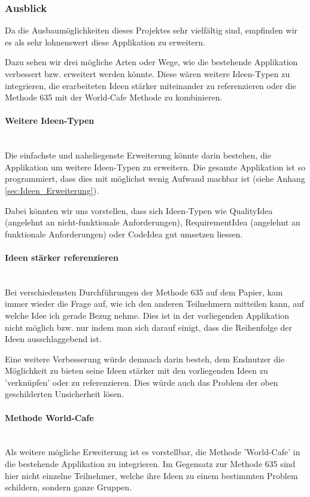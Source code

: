 \subsubsection{Ausblick}
\label{subsub:Ausblick}
Da die Ausbaumöglichkeiten dieses Projektes sehr vielfältig sind, empfinden wir es als sehr lohnenswert diese Applikation zu erweitern.

Dazu sehen wir drei mögliche Arten oder Wege, wie die bestehende Applikation verbessert bzw. erweitert werden könnte. Diese wären weitere Ideen-Typen zu integrieren, die erarbeiteten Ideen stärker miteinander zu referenzieren oder die Methode 635 mit der World-Cafe Methode zu kombinieren.

\paragraph*{Weitere Ideen-Typen}~\\
Die einfachste und naheliegenste Erweiterung könnte darin bestehen, die Applikation um weitere Ideen-Typen zu erweitern. Die gesamte Applikation ist so programmiert, dass dies mit möglichst wenig Aufwand machbar ist (siehe Anhang \ref{sec:Ideen_Erweiterung}). 

Dabei könnten wir uns vorstellen, dass sich Ideen-Typen wie QualityIdea (angelehnt an nicht-funktionale Anforderungen), RequirementIdea (angelehnt an funktionale Anforderungen)  oder CodeIdea gut umsetzen liessen.

\paragraph*{Ideen stärker referenzieren}~\\
Bei verschiedensten Durchführungen der Methode 635 auf dem Papier, kam immer wieder die Frage auf, wie ich den anderen Teilnehmern mitteilen kann, auf welche Idee ich gerade Bezug nehme. Dies ist in der vorliegenden Applikation nicht möglich bzw. nur indem man sich darauf einigt, dass die Reihenfolge der Ideen ausschlaggebend ist.

Eine weitere Verbesserung würde demnach darin besteh, dem Endnutzer die Möglichkeit zu bieten seine Ideen stärker mit den vorliegenden Ideen zu 'verknüpfen' oder zu referenzieren. Dies würde auch das Problem der oben geschilderten Unsicherheit lösen.

\paragraph*{Methode World-Cafe}~\\
Als weitere mögliche Erweiterung ist es vorstellbar, die Methode 'World-Cafe' \cite{world-cafe} in die bestehende Applikation zu integrieren. Im Gegensatz zur Methode 635 sind hier nicht einzelne Teilnehmer, welche ihre Ideen zu einem bestimmten Problem schildern, sondern ganze Gruppen.


